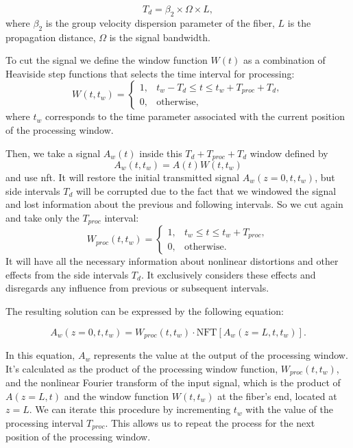 \begin{equation}
    T_d = \beta_2 \times \Omega \times L {,}
\end{equation}
where $\beta_2$ is the group velocity dispersion parameter of the fiber, $L$ is the propagation distance, $\Omega$ is the signal bandwidth.

To cut the signal we define the window function $W(t)$ as a combination of Heaviside step functions that selects the time interval for processing:
\begin{equation}
W(t, t_w) = \begin{cases}
1, & t_w - T_d \leq t \leq t_w + T_{proc} + T_d, \\
0, & \text{otherwise} {,}
\end{cases}
\end{equation}
where $t_w$ corresponds to the time parameter associated with the current position of the processing window.

Then, we take a signal $A_w(t)$ inside this $T_d + T_{proc} + T_d$ window defined by 
\begin{equation}
    A_w(t, t_w) = A(t) W(t, t_w)
\label{eq:window}
\end{equation}
and use \acrshort{nft}. 
It will restore the initial transmitted signal $A_w(z = 0, t, t_w)$, but side intervals $T_d$ will be corrupted due to the fact that we windowed the signal and lost information about the previous and following intervals. So we cut again and take only the $T_{proc}$ interval:
\begin{equation}
W_{proc}(t, t_w) = \begin{cases}
1, & t_w \leq t \leq t_w + T_{proc}, \\
0, & \text{otherwise} {.}
\end{cases}
\end{equation}
It will have all the necessary information about nonlinear distortions and other effects from the side intervals $T_d$. It exclusively considers these effects and disregards any influence from previous or subsequent intervals.

The resulting solution can be expressed by the following equation:

\begin{equation}
A_w(z = 0, t, t_w) = W_{proc}(t, t_w) \cdot \mathrm{NFT}[A_w(z = L, t, t_w)] {.}
\end{equation}

In this equation, $A_w$ represents the value at the output of the processing window. It's calculated as the product of the processing window function, $W_{proc}(t, t_w)$, and the nonlinear Fourier transform of the input signal, which is the product of $A(z=L,t)$ and the window function $W(t, t_w)$ at the fiber's end, located at $z=L$. We can iterate this procedure by incrementing $t_w$ with the value of the processing interval $T_{proc}$. This allows us to repeat the process for the next position of the processing window.

